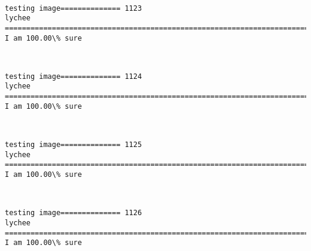 \documentclass[11pt]{article}
\begin{document}
    \begin{center}
    \end{center}
    { \hspace*{\fill} \\}
    
    \begin{Verbatim}[commandchars=\\\{\}]
testing image============== 1123
lychee
============================================================================
I am 100.00\% sure

    \end{Verbatim}

    \begin{center}
    \end{center}
    { \hspace*{\fill} \\}
    
    \begin{Verbatim}[commandchars=\\\{\}]
testing image============== 1124
lychee
============================================================================
I am 100.00\% sure

    \end{Verbatim}

    \begin{center}
    \end{center}
    { \hspace*{\fill} \\}
    
    \begin{Verbatim}[commandchars=\\\{\}]
testing image============== 1125
lychee
============================================================================
I am 100.00\% sure

    \end{Verbatim}

    \begin{center}
    \end{center}
    { \hspace*{\fill} \\}
    
    \begin{Verbatim}[commandchars=\\\{\}]
testing image============== 1126
lychee
============================================================================
I am 100.00\% sure

    \end{Verbatim}
\end{document}
